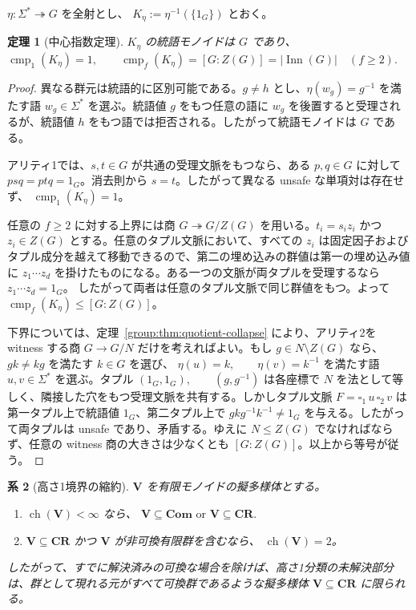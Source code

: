 \documentclass[10pt,a4paper]{ltjsarticle}
\newtheorem{theorem}{定理}[section]
\newtheorem{corollary}[theorem]{系}
\theoremstyle{definition}
\theoremstyle{remark}
\newcommand{\cmp}{\operatorname{cmp}}
\newcommand{\blank}{\square}
\begin{document}
\(\eta:\Sigma^*\twoheadrightarrow G\)
を全射とし、
\(K_\eta:=\eta^{-1}(\{1_G\})\)
とおく。

\begin{theorem}[中心指数定理]
\label{group:thm:center-index}
$K_\eta$ の統語モノイドは $G$ であり、
\(
\cmp_1(K_\eta)=1,
\qquad
\cmp_f(K_\eta)=[G:Z(G)]=|\operatorname{Inn}(G)|
\quad(f\ge2).
\)
\end{theorem}

\begin{proof}
異なる群元は統語的に区別可能である。$g\neq h$ とし、$\eta(w_g)=g^{-1}$ を満たす語 $w_g\in\Sigma^*$ を選ぶ。統語値 $g$ をもつ任意の語に $w_g$ を後置すると受理されるが、統語値 $h$ をもつ語では拒否される。したがって統語モノイドは $G$ である。

アリティ1では、$s,t\in G$ が共通の受理文脈をもつなら、ある $p,q\in G$ に対して
$psq=ptq=1_G$。消去則から $s=t$。したがって異なる unsafe な単項対は存在せず、
\(\cmp_1(K_\eta)=1\)。

任意の $f\ge2$ に対する上界には商
$G\twoheadrightarrow G/Z(G)$
を用いる。$t_i=s_i z_i$ かつ $z_i\in Z(G)$ とする。任意のタプル文脈において、すべての $z_i$ は固定因子およびタプル成分を越えて移動できるので、第二の埋め込みの群値は第一の埋め込み値に $z_1\cdots z_d$ を掛けたものになる。ある一つの文脈が両タプルを受理するなら
$z_1\cdots z_d=1_G$。
したがって両者は任意のタプル文脈で同じ群値をもつ。よって
\(\cmp_f(K_\eta)\le [G:Z(G)]\)。

下界については、定理~\ref{group:thm:quotient-collapse} により、アリティ2を witness する商
$G\to G/N$
だけを考えればよい。もし $g\in N\setminus Z(G)$ なら、$gk\neq kg$ を満たす $k\in G$ を選び、
\(
\eta(u)=k,
\qquad
\eta(v)=k^{-1}
\)
を満たす語 $u,v\in\Sigma^*$ を選ぶ。タプル
\((1_G,1_G), \qquad (g,g^{-1})\)
は各座標で $N$ を法として等しく、隣接した穴をもつ受理文脈を共有する。しかしタプル文脈
\(F=\blank_1\,u\,\blank_2\,v\)
は第一タプル上で統語値 $1_G$、第二タプル上で
$gkg^{-1}k^{-1}\neq1_G$
を与える。したがって両タプルは unsafe であり、矛盾する。ゆえに
$N\le Z(G)$
でなければならず、任意の witness 商の大きさは少なくとも
$[G:Z(G)]$。以上から等号が従う。
\end{proof}

\begin{corollary}[高さ1境界の縮約]
\label{height:cor:height-one-reduction}
\(\mathbf V\) を有限モノイドの擬多様体とする。
\begin{enumerate}[label=\textup{(\roman*)},leftmargin=*]
\item \(\operatorname{ch}(\mathbf V)<\infty\) なら、
\(
 \mathbf V\subseteq\mathbf{Com}
 \text{ or }
 \mathbf V\subseteq\mathbf{CR}.
\)
\item \(\mathbf V\subseteq\mathbf{CR}\) かつ \(\mathbf V\) が非可換有限群を含むなら、
\(\operatorname{ch}(\mathbf V)=2\)。
\end{enumerate}
したがって、すでに解決済みの可換な場合を除けば、高さ1分類の未解決部分は、群として現れる元がすべて可換群であるような擬多様体
\(\mathbf V\subseteq\mathbf{CR}\)
に限られる。
\end{corollary}
\end{document}
